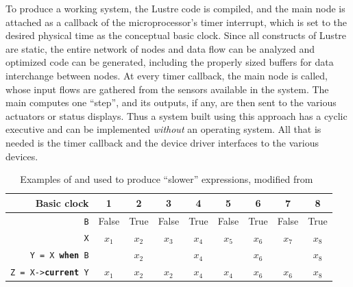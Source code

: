 To produce a working system, the Lustre code is compiled, and the main
node is attached as a callback of the microprocessor's timer
interrupt, which is set to the desired physical time as the conceptual
basic clock. Since all constructs of Lustre are static, the entire
network of nodes and data flow can be analyzed and optimized code can
be generated, including the properly sized buffers for data
interchange between nodes. At every timer callback, the main node is
called, whose input flows are gathered from the sensors available in
the system. The main computes one ``step'', and its outputs, if any,
are then sent to the various actuators or status displays. Thus a
system built using this approach has a cyclic executive and can be
implemented \emph{without} an operating system. All that is needed is
the timer callback and the device driver interfaces to the various
devices.

\begin{table}
\centering
\begin{tabular}{r|c|c|c|c|c|c|c|c}
\hline
Basic clock & 1 & 2 & 3 & 4 & 5 & 6 & 7 & 8\\
\hline
\texttt{B} & False & True & False & True & False & True & False & True\\
\hline
\texttt{X} & $x_1$ & $x_2$ & $x_3$ & $x_4$ & $x_5$ & $x_6$ & $x_7$ & $x_8$\\
\hline
\texttt{Y = X \textbf{when} B} & & $x_2$ & & $x_4$ & & $x_6$ & & $x_8$\\
\hline
\texttt{Z = X->\textbf{current} Y} & $x_1$ & $x_2$ & $x_2$ & $x_4$ & $x_4$ & $x_6$ &
$x_6$ & $x_8$\\
\hline
\end{tabular}
\caption{Examples of  and  used to produce
  ``slower'' expressions, modified from~\cite{halbwachs@ieee91}}
\label{tab:lustre_whencurrent}
\end{table}

